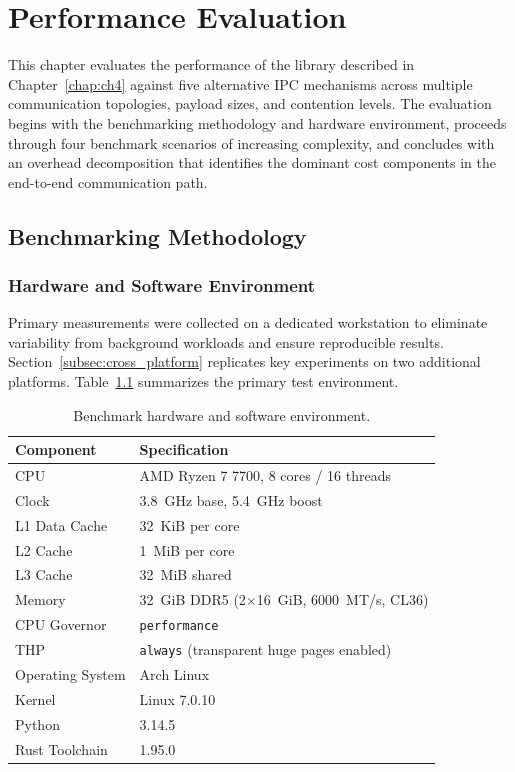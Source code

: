 \chapter{Performance Evaluation}
\label{chap:ch5}


This chapter evaluates the performance of the library described in Chapter~\ref{chap:ch4} against five alternative IPC mechanisms across multiple communication topologies, payload sizes, and contention levels. The evaluation begins with the benchmarking methodology and hardware environment, proceeds through four benchmark scenarios of increasing complexity, and concludes with an overhead decomposition that identifies the dominant cost components in the end-to-end communication path.

\section{Benchmarking Methodology}
\label{sec:bench_methodology}

\subsection{Hardware and Software Environment}

Primary measurements were collected on a dedicated workstation to eliminate variability from background workloads and ensure reproducible results. Section~\ref{subsec:cross_platform} replicates key experiments on two additional platforms. Table~\ref{tab:environment} summarizes the primary test environment.

\begin{table}[htbp]
    \centering
    \caption{Benchmark hardware and software environment.}
    \label{tab:environment}
    \begin{tabular}{ll}
        \hline
        \textbf{Component} & \textbf{Specification} \\
        \hline
        CPU & AMD Ryzen 7 7700, 8 cores / 16 threads \\
        Clock & 3.8~GHz base, 5.4~GHz boost \\
        L1 Data Cache & 32~KiB per core \\
        L2 Cache & 1~MiB per core \\
        L3 Cache & 32~MiB shared \\
        Memory & 32~GiB DDR5 (2$\times$16~GiB, 6000~MT/s, CL36) \\
        CPU Governor & \texttt{performance} \\
        THP & \texttt{always} (transparent huge pages enabled) \\
        Operating System & Arch Linux \\
        Kernel & Linux 7.0.10 \\
        Python & 3.14.5 \\
        Rust Toolchain & 1.95.0 \\
        \hline
    \end{tabular}
\end{table}


